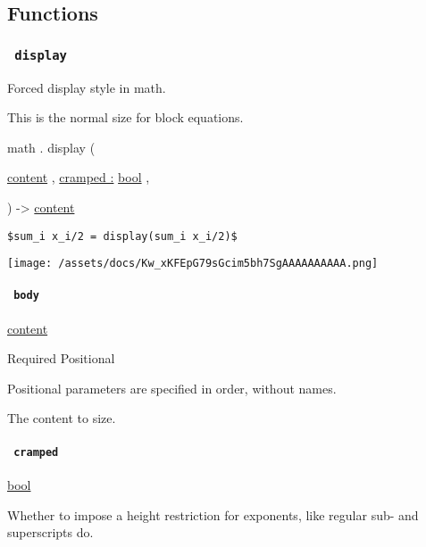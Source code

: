 \subsection{Functions}\label{functions}

\subsubsection{\texorpdfstring{\texttt{\ display\ }}{ display }}\label{functions-display}

Forced display style in math.

This is the normal size for block equations.

math { . } { display } (

{ \href{/docs/reference/foundations/content/}{content} , } {
\hyperref[functions-display-parameters-cramped]{cramped :}
\href{/docs/reference/foundations/bool/}{bool} , }

) -\textgreater{} \href{/docs/reference/foundations/content/}{content}

\begin{verbatim}
$sum_i x_i/2 = display(sum_i x_i/2)$
\end{verbatim}

\texttt{[image: /assets/docs/Kw\_xKFEpG79sGcim5bh7SgAAAAAAAAAA.png]}

\paragraph{\texorpdfstring{\texttt{\ body\ }}{ body }}\label{functions-display-body}

\href{/docs/reference/foundations/content/}{content}

{Required} {{ Positional }}

\label{functions-display-body-positional-tooltip}
Positional parameters are specified in order, without names.

The content to size.

\paragraph{\texorpdfstring{\texttt{\ cramped\ }}{ cramped }}\label{functions-display-cramped}

\href{/docs/reference/foundations/bool/}{bool}

Whether to impose a height restriction for exponents, like regular sub-
and superscripts do.


